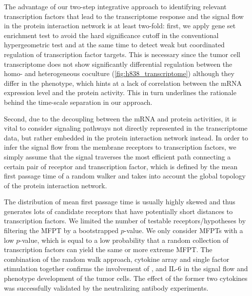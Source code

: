 The advantage of our two-step integrative approach to identifying 
relevant transcription factors that lead to the transcriptome response
and the signal flow in the protein interaction network 
is at least two-fold: first, we apply gene set enrichment test to avoid the hard 
significance cutoff in the conventional hypergeometric test and at the same time
to detect weak but coordinated regulation of transcription factor targets. This is 
necessary since the tumor cell transcriptome does not show significantly
differential regulation between the homo- and heterogeneous coculture 
(\ref{fig:h838_transcriptome}) although they differ in the phenotype, which 
hints at a lack of correlation between the mRNA expression level and the protein 
activity. This in turn underlines the rationale behind the time-scale separation
in our approach. 

Second, due to the decoupling between the mRNA and protein
activities, it is vital to consider signaling pathways not directly represented
in the transcriptome data, but rather embedded in the protein interaction network
instead. In order to infer the signal flow from the membrane receptors to 
transcription factors, we simply assume that the signal traverses the most efficient
path connecting a certain pair of receptor and transcription factor, which is 
defined by the mean first passage time of a random walker and takes into account
the global topology of the protein interaction network.

The distribution of mean first passage time is usually
highly skewed and thus generates lots of candidate
receptors that have potentially short distances to
transcription factors. We limited the number of testable
receptors/hypotheses by filtering the MFPT by a bootstrapped
$p$-value. We only consider MFPTs with a low $p$-value,
which is equal to a low
probability that a random collection of transcription 
factors can yield the same or more extreme MFPT.
The combination of the random walk approach, cytokine array and single factor
stimulation together confirms the involvement of \tnfa, 
\sdfonea and 
IL-6 in the
signal flow and phenotype development of the tumor cells. 
The effect of the former two cytokines was successfully 
validated by the 
neutralizing antibody experiments.

